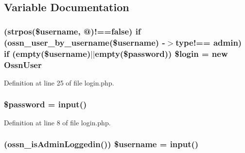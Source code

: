 \subsection{Variable Documentation}
\subsubsection[{\texorpdfstring{\$login}{$login}}]{ (strpos(\${\bf username}, \textquotesingle{}@\textquotesingle{})!==false) {\bf if} ({\bf ossn\+\_\+user\+\_\+by\+\_\+username}(\${\bf username}) -\/$>$type!== \textquotesingle{}admin\textquotesingle{}) {\bf if} (empty(\${\bf username})$\vert$$\vert$empty(\${\bf password})) \$login = new {\bf Ossn\+User}}\hypertarget{actions_2administrator_2login_8php_a299d1072474bc26bde7ef4df4ac51f51}{}\label{actions_2administrator_2login_8php_a299d1072474bc26bde7ef4df4ac51f51}


Definition at line 25 of file login.\+php.

\subsubsection[{\texorpdfstring{\$password}{$password}}]{\setlength{\rightskip}{0pt plus 5cm}\${\bf password} = {\bf input}(\textquotesingle{})}\hypertarget{actions_2administrator_2login_8php_a607686ef9f99ea7c42f4f3dd3dbb2b0d}{}\label{actions_2administrator_2login_8php_a607686ef9f99ea7c42f4f3dd3dbb2b0d}


Definition at line 8 of file login.\+php.

\subsubsection[{\texorpdfstring{\$username}{$username}}]{ ({\bf ossn\+\_\+is\+Admin\+Loggedin}()) \${\bf username} = {\bf input}(\textquotesingle{})}\hypertarget{actions_2administrator_2login_8php_af5c582607f73d1c406e2cbd407aef116}{}\label{actions_2administrator_2login_8php_af5c582607f73d1c406e2cbd407aef116}


